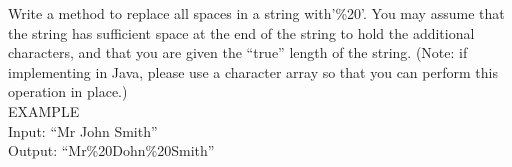  \label{sssec:ex1_04}

Write a method to replace all spaces in a string with'\%20'. You may assume that the string has sufficient space at the end of the string to hold the additional characters, and that you are given the ``true'' length of the string. (Note: if implementing in Java, please use a character array so that you can perform this operation in place.)\\

EXAMPLE\\
Input: ``Mr John Smith''\\
Output: ``Mr\%20Dohn\%20Smith''




